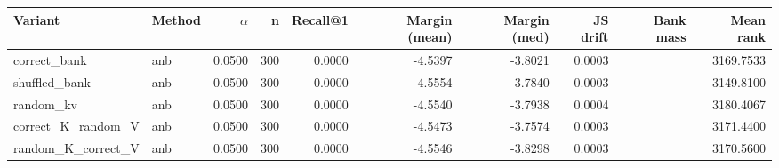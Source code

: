 \begin{tabular}{l l r r r r r r r r}
\toprule
Variant & Method & $\alpha$ & n & Recall@1 & Margin (mean) & Margin (med) & JS drift & Bank mass & Mean rank \\
\midrule
correct\_bank & anb & 0.0500 & 300 & 0.0000 & -4.5397 & -3.8021 & 0.0003 &  & 3169.7533 \\
shuffled\_bank & anb & 0.0500 & 300 & 0.0000 & -4.5554 & -3.7840 & 0.0003 &  & 3149.8100 \\
random\_kv & anb & 0.0500 & 300 & 0.0000 & -4.5540 & -3.7938 & 0.0004 &  & 3180.4067 \\
correct\_K\_random\_V & anb & 0.0500 & 300 & 0.0000 & -4.5473 & -3.7574 & 0.0003 &  & 3171.4400 \\
random\_K\_correct\_V & anb & 0.0500 & 300 & 0.0000 & -4.5546 & -3.8298 & 0.0003 &  & 3170.5600 \\
\bottomrule
\end{tabular}
